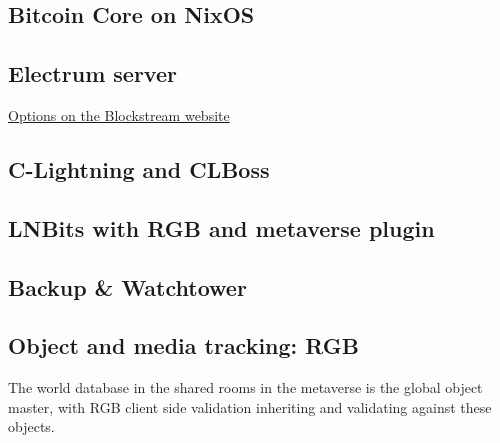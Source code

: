 \subsection{Bitcoin Core on NixOS}
\lipsum[50]
\subsection{Electrum server}
\href{https://blog.blockstream.com/en-esplora-and-other-alternatives-to-electrumx/}{Options on the Blockstream website}
\lipsum[50]
\subsection{C-Lightning and CLBoss}
\lipsum[50]
\subsection{LNBits with RGB and metaverse plugin}
\subsection{Backup \& Watchtower}
\lipsum[50]
\subsection{Object and media tracking: RGB}
The world database in the shared rooms in the metaverse is the global object master, with RGB client side validation inheriting and validating against these objects.\\

